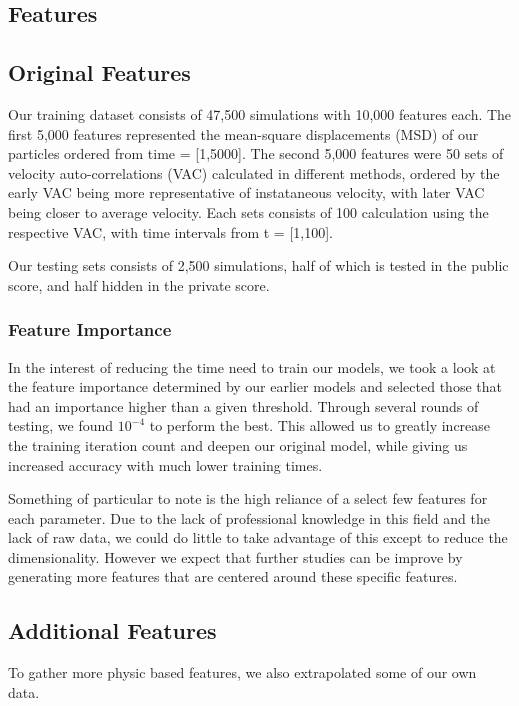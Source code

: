 \documentclass[a4paper, 12pt]{article}
\begin{document}
        \begin{multicols}{2}
        \section{Features}
        \subsection{Original Features}
        Our training dataset consists of 47,500 simulations with 10,000 features each. The first 5,000 features represented the mean-square displacements (MSD) of our particles ordered from time = [1,5000]. The second 5,000 features were 50 sets of velocity auto-correlations (VAC) calculated in different methods, ordered by the early VAC being more representative of instataneous velocity, with later VAC being closer to average velocity. Each sets consists of 100 calculation using the respective VAC, with time intervals from t = [1,100].
        
        Our testing sets consists of 2,500 simulations, half of which is tested in the public score, and half hidden in the private score.

            \subsubsection{Feature Importance}
                In the interest of reducing the time need to train our models, we took a look at the feature importance determined by our earlier models and selected those that had an importance higher than a given threshold. Through several rounds of testing, we found $10^{-4}$ to perform the best. This allowed us to greatly increase the training iteration count and deepen our original model, while giving us increased accuracy with much lower training times.
                
                Something of particular to note is the high reliance of a select few features for each parameter. Due to the lack of professional knowledge in this field and the lack of raw data, we could do little to take advantage of this except to reduce the dimensionality. However we expect that further studies can be improve by generating more features that are centered around these specific features.

            \subsection{Additional Features}
                To gather more physic based features, we also extrapolated some of our own data.


\end{multicols}
\end{document}
